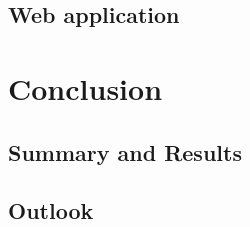 \documentclass[%
	pdftex,%
	a4paper,%
	oneside,%
	chapterprefix,%
	headsepline,%
	12pt%
]{scrbook}
\begin{document}






\section{Web application}
\chapter{Conclusion}\label{conclusion}
\section{Summary and Results}
\section{Outlook}




% 

% 
\end{document}
